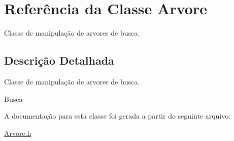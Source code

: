 \hypertarget{classArvore}{}\section{Referência da Classe Arvore}
\label{classArvore}


Classe de manipulação de arvores de busca.  




\subsection{Descrição Detalhada}
Classe de manipulação de arvores de busca. 

Busca 

A documentação para esta classe foi gerada a partir do seguinte arquivo\+:\begin{DoxyCompactItemize}
\item 
\hyperlink{Arvore_8h}{Arvore.\+h}\end{DoxyCompactItemize}
